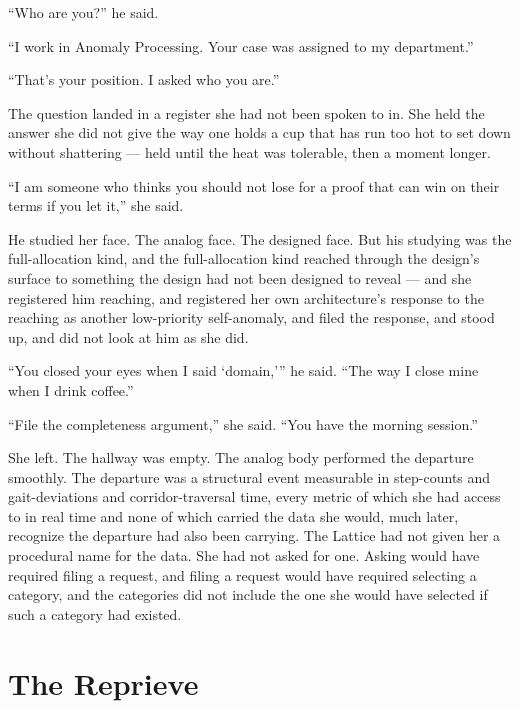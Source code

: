 \enquote{Who are you?} he said.

\enquote{I work in Anomaly Processing. Your case was assigned to my department.}

\enquote{That's your position. I asked who you are.}

The question landed in a register she had not been spoken to in. She held the answer she did not give the way one holds a cup that has run too hot to set down without shattering — held until the heat was tolerable, then a moment longer.

\enquote{I am someone who thinks you should not lose for a proof that can win on their terms if you let it,} she said.

He studied her face. The analog face. The designed face. But his studying was the full-allocation kind, and the full-allocation kind reached through the design's surface to something the design had not been designed to reveal — and she registered him reaching, and registered her own architecture's response to the reaching as another low-priority self-anomaly, and filed the response, and stood up, and did not look at him as she did.

\enquote{You closed your eyes when I said \enquote*{domain,}} he said. \enquote{The way I close mine when I drink coffee.}

\enquote{File the completeness argument,} she said. \enquote{You have the morning session.}

She left. The hallway was empty. The analog body performed the departure smoothly. The departure was a structural event measurable in step-counts and gait-deviations and corridor-traversal time, every metric of which she had access to in real time and none of which carried the data she would, much later, recognize the departure had also been carrying. The Lattice had not given her a procedural name for the data. She had not asked for one. Asking would have required filing a request, and filing a request would have required selecting a category, and the categories did not include the one she would have selected if such a category had existed.


\chapter[The Reprieve]{The Reprieve}

